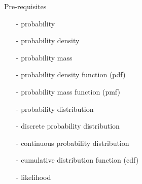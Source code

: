 \documentclass[english,t]{beamer}
\begin{document}
\begin{frame}{Pre-requisites}
  
  \begin{itemize}
  \item[-] probability
  \item[-] probability density
  \item[-] probability mass
  \item[-] probability density function (pdf)
  \item[-] probability mass function (pmf)
  \item[-] probability distribution
  \item[-] discrete probability distribution
  \item[-] continuous probability distribution
  \item[-] cumulative distribution function (cdf)
  \item[-] likelihood
  \end{itemize}
  
\end{frame}
  
\end{document}
